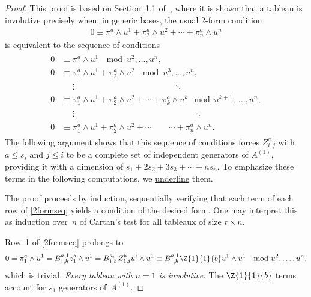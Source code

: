 \begin{proof}
This proof is based on Section~1.1 of~\cite{Yang1987}, where it is shown that a
tableau is involutive precisely when, in generic bases, the usual 2-form condition
\begin{gather*}
0 \equiv \pi^a_1 \wedge u^1 + \pi^a_2 \wedge u^2 +
\cdots + \pi^a_n\wedge u^n
\label{2form}
\end{gather*}
is equivalent to the sequence of conditions
\begin{gather}
\begin{split}
0 &\equiv \pi^a_1 \wedge u^1 \ \mod  u^2, \ldots, u^n, \\
0 &\equiv \pi^a_1 \wedge u^1 + \pi^a_2 \wedge u^2 \ \mod  u^3, \ldots, u^n, \\
  &\phantom{=}\vdots \phantom{\pi^a_1 \wedge u^1 + \pi^a_2 \wedge u^2 + \pi^a_3 \wedge u^3}\ddots \\
0 &\equiv \pi^a_1 \wedge u^1 + \pi^a_2 \wedge u^2 + \cdots + \pi^a_k
\wedge u^k  \mod  u^{k+1},\ \ldots, u^n, \\
  &\phantom{=}\vdots \phantom{\pi^a_1 \wedge u^1 + \pi^a_2 \wedge u^2 + \cdots + \pi^a_i \wedge u^i,}\ddots
      \\
0 &\equiv  \pi^a_1 \wedge u^1 + \pi^a_2 \wedge u^2 +
 \cdots\qquad\cdots + \pi^a_n\wedge u^n.
\end{split}
\label{2formseq}
\end{gather}
The following argument shows that this sequence of conditions forces $Z^a_{i,j}$ with $a
\leq s_i$ and $j \leq i$ to be a complete set of independent generators of
$A^{(1)}$, providing it with a dimension of $s_1 + 2s_2 + 3s_3 + \cdots + n
s_n$.   To emphasize these terms in the following computations, we
\underline{underline} them.

The proof proceeds by induction, sequentially verifying that each term of
each row of \eqref{2formseq} yields a condition of the desired form.  One may
interpret this as induction over~$n$ of Cartan's test for all tableaux
of size $r \times n$.

Row~1 of \eqref{2formseq} prolongs to
\begin{gather*}
0 = \pi^a_1 \wedge u^1
  = B^{a,1}_{1,b} z^b_1 \wedge u^1
  = B^{a,1}_{1,b} Z^b_{1,i} u^i \wedge u^1
  \equiv
     B^{a,1}_{1,b} \Z{1}{1}{b} u^1 \wedge u^1 \  \mod u^2, \ldots, u^n,
\end{gather*}
which is trivial.  \emph{Every tableau with $n=1$ is
involutive.}   The $\Z{1}{1}{b}$ terms account for $s_1$ generators
of~$A^{(1)}$.


\end{proof}
